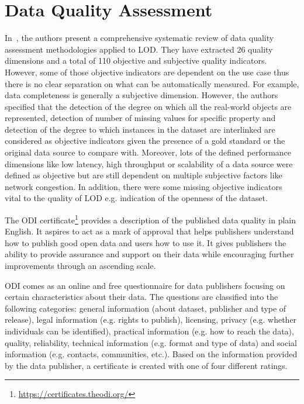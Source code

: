 \section{Data Quality Assessment}
\label{section:data-quality-assessment}
In~\cite{Zaveri:SemWebJorunal:12}, the authors present a comprehensive systematic review of data quality assessment methodologies applied to LOD. They have extracted 26 quality dimensions and a total of 110 objective and subjective quality indicators. However, some of those objective indicators are dependent on the use case thus there is no clear separation on what can be automatically measured. For example, data completeness is generally a subjective dimension. However, the authors specified that the detection of the degree on which all the real-world objects are represented, detection of number of missing values for specific property and detection of the degree to which instances in the dataset are interlinked are considered as objective indicators given the presence of a gold standard or the original data source to compare with. Moreover, lots of the defined performance dimensions like low latency, high throughput or scalability of a data source were defined as objective but are still dependent on multiple subjective factors like network congestion. In addition, there were some missing objective indicators vital to the quality of LOD e.g. indication of the openness of the dataset.

The ODI certificate\footnote{\url{https://certificates.theodi.org/}} provides a description of the published data quality in plain English. It aspires to act as a mark of approval that helps publishers understand how to publish good open data and users how to use it. It gives publishers the ability to provide assurance and support on their data while encouraging further improvements through an ascending scale.

ODI comes as an online and free questionnaire for data publishers focusing on certain characteristics about their data. The questions are classified into the following categories: general information (about dataset, publisher and type of release), legal information (e.g. rights to publish), licensing, privacy (e.g. whether individuals can be identified), practical information (e.g. how to reach the data), quality, reliability, technical information (e.g. format and type of data) and social information (e.g. contacts, communities, etc.). Based on the information provided  by the data  publisher, a certificate is created with one of four different ratings.

